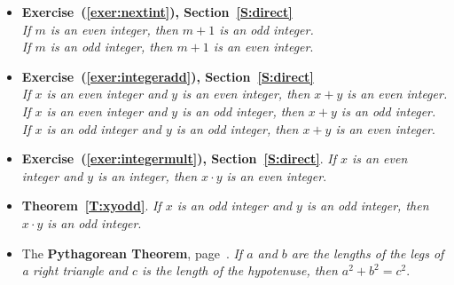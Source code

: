 %
\begin{itemize}
\item \textbf{Exercise~(\ref{exer:nextint}), Section~\ref{S:direct}} \\
\emph{
If $m$ is an even integer, then $m+1$ is an odd integer. \\ 
If $m$ is an odd integer, then $m+1$ is an even integer}.

\item \textbf{Exercise~(\ref{exer:integeradd}), Section~\ref{S:direct}} \\
\emph{
If $x$ is an even integer and $y$ is an even integer, then $x+y$ is an even integer.  \\
If $x$ is an even integer and $y$ is an odd integer, then $x+y$ is an odd integer. \\
If $x$ is an odd integer and $y$ is an odd integer, then $x+y$ is an even integer}.

\item \textbf{Exercise~(\ref{exer:integermult}),  Section~\ref{S:direct}}.  \emph{If $x$ is an even integer and $y$ is an integer, then $ x \cdot y $ is an even integer}.

\item \textbf{Theorem~\ref{T:xyodd}}.  \emph{If $x$ is an odd integer and $y$ is an odd integer, then $ x \cdot y $ is an odd integer}.

\item The \textbf{Pythagorean Theorem}, page~\pageref{pr:pythag}.  \emph{If $a$ and $b$ are the lengths of the legs of a right triangle and $c$ is the length of the hypotenuse, then $a^2 + b^2 = c^2$}. 
\end{itemize}

\endinput
